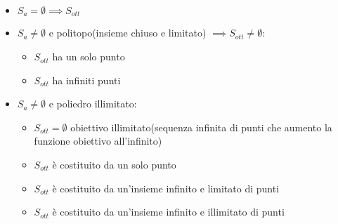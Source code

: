 \begin{itemize}
	\item $S_{a} = \emptyset \implies S_{ott}$
	\item $S_{a} \neq \emptyset$ e politopo(insieme chiuso e limitato) $\implies S_{ott} \neq \emptyset$:
	      \begin{itemize}
		      \item $S_{ott}$ ha un solo punto
		      \item $S_{ott}$ ha infiniti punti
	      \end{itemize}
	\item $S_{a} \neq \emptyset$ e poliedro illimitato:
	      \begin{itemize}
		      \item $S_{ott} = \emptyset$ obiettivo illimitato(sequenza infinita di punti che aumento la funzione obiettivo all'infinito)
		      \item $S_{ott}$ è costituito da un solo punto
		      \item $S_{ott}$ è costituito da un'insieme infinito e limitato di punti
		      \item $S_{ott}$ è costituito da un'insieme infinito e illimitato di punti
	      \end{itemize}
\end{itemize}
